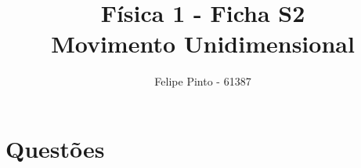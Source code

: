 \documentclass[12pt]{article}
\begin{document}
\title{\bfseries\color{DarkGreen!75!}%
	Física 1 - Ficha S2\\
	Movimento Unidimensional%
}
\author{Felipe Pinto - 61387}

\maketitle
\tableofcontents
\break

\part{Questões}
\renewcommand\thesection{Questão \arabic{section}}
\renewcommand\thesubsection%
{%
	Q\arabic{section} - \alph{subsection})%
}

\section{}
\end{document}
